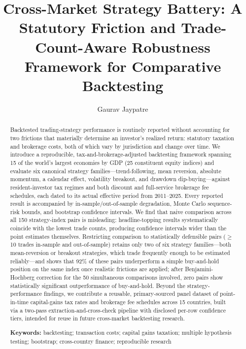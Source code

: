 \documentclass[11pt]{article}
\title{\textbf{Cross-Market Strategy Battery: A Statutory Friction and Trade-Count-Aware Robustness Framework for Comparative Backtesting}}
\author[1]{Gaurav Jaypatre}
\affil[1]{Independent Researcher}
\date{}
\begin{document}
\maketitle

\begin{abstract}
\noindent Backtested trading-strategy performance is routinely reported without accounting for two frictions that materially determine an investor's realized return: statutory taxation and brokerage costs, both of which vary by jurisdiction and change over time. We introduce a reproducible, tax-and-brokerage-adjusted backtesting framework spanning 15 of the world's largest economies by GDP (25 constituent equity indices) and evaluate six canonical strategy families---trend-following, mean reversion, absolute momentum, a calendar effect, volatility breakout, and drawdown dip-buying---against resident-investor tax regimes and both discount and full-service brokerage fee schedules, each dated to its actual effective period from 2011--2025. Every reported result is accompanied by in-sample/out-of-sample degradation, Monte Carlo sequence-risk bounds, and bootstrap confidence intervals. We find that naive comparison across all 150 strategy-index pairs is misleading: headline-topping results systematically coincide with the lowest trade counts, producing confidence intervals wider than the point estimates themselves. Restricting comparison to statistically defensible pairs ($\geq$10 trades in-sample and out-of-sample) retains only two of six strategy families---both mean-reversion or breakout strategies, which trade frequently enough to be estimated reliably---and shows that 92\% of these pairs underperform a simple buy-and-hold position on the same index once realistic frictions are applied; after Benjamini-Hochberg correction for the 50 simultaneous comparisons involved, zero pairs show statistically significant outperformance of buy-and-hold. Beyond the strategy-performance findings, we contribute a reusable, primary-sourced panel dataset of point-in-time capital-gains tax rates and brokerage fee schedules across 15 countries, built via a two-pass extraction-and-cross-check pipeline with disclosed per-row confidence tiers, intended for reuse in future cross-market backtesting research.

\vspace{0.5em}
\noindent\textbf{Keywords:} backtesting; transaction costs; capital gains taxation; multiple hypothesis testing; bootstrap; cross-country finance; reproducible research
\end{abstract}
\end{document}
